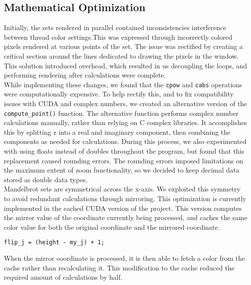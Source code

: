 \documentclass{article}
\begin{document}
\pagebreak

\subsection{Mathematical Optimization}

Initially, the sets rendered in parallel contained inconsistencies 
interference between thread color settings.This was expressed through 
incorrectly colored pixels rendered at various points of the set.
The issue was rectified by creating a critical section around the lines
dedicated to drawing the pixels in the window.
This solution introduced overhead, which resulted in us decoupling the 
loops, and performing rendering after calculations were complete.\\

While implementing these changes, we found that the \verb|cpow| and 
\verb|cabs| operations were computationally expensive.
To help rectify this, and to fix compatibility issues with CUDA and complex
numbers, we created an alternative version of the \verb|compute_point()| 
function.
The alternative function performs complex number calculations manually,
rather than relying on C complex libraries.
It accomplishes this by splitting z into a real and imaginary component, 
then combining the components as needed for calculations.
During this process, we also experimented with using floats instead of 
doubles throughout the program, but found that this replacement caused 
rounding errors.
The rounding errors imposed limitations on the maximum extent of zoom 
functionality, so we decided to keep decimal data stored as double data 
types.\\

Mandelbrot sets are symmetrical across the x-axis.
We exploited this symmetry to avoid redundant calculations through
mirroring.
This optimization is currently implemented in the cached CUDA version of
the project.
This version computes the mirror value of the coordinate currently being 
processed, and caches the same color value for both the original coordinate
and the mirrored coordinate.

\begin{verbatim}
flip_j = (height - my_j) + 1;
\end{verbatim}

When the mirror coordinate is processed, it is then able to fetch a color
from the cache rather than recalculating it.
This modification to the cache reduced the required amount of calculations 
by half.
\end{document}
